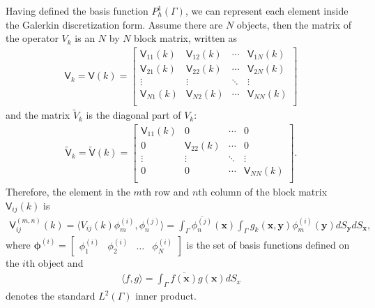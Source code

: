 Having defined the basis function $P_{h}^{1}(\Gamma)$, we can represent each element inside the Galerkin discretization form. Assume there are $N$ objects,
then the matrix of the operator $V_{k}$ is an $N$ by $N$ block matrix, written as 
\begin{align}\label{matrix V}
    \mathsf{V}_{k} = \mathsf{V}(k) = \begin{bmatrix}
        \mathsf{V}_{11}(k) & \mathsf{V}_{12}(k) & \cdots & \mathsf{V}_{1N}(k) \\
        \mathsf{V}_{21}(k) & \mathsf{V}_{22}(k) & \cdots & \mathsf{V}_{2N}(k) \\
        \vdots & \vdots & \ddots & \vdots \\
        \mathsf{V}_{N1}(k) & \mathsf{V}_{N2}(k) & \cdots & \mathsf{V}_{NN}(k) \\
\end{bmatrix}
\end{align}
and the matrix $\tilde{V}_{k}$ is the diagonal part of $V_{k}$:
\begin{align}\label{matrix tilde V}
    \tilde{\mathsf{V}}_{k} =  \tilde{\mathsf{V}}(k) = \begin{bmatrix}
        \mathsf{V}_{11}(k) & 0      & \cdots & 0 \\
    0      & \mathsf{V}_{22}(k) & \cdots & 0\\
    \vdots & \vdots & \ddots & \vdots \\
    0      & 0      & \cdots & \mathsf{V}_{NN}(k) \\
\end{bmatrix}.
\end{align}
Therefore, the element in the $m$th row and $n$th column of the block matrix $\mathsf{V}_{ij}(k)$ is 
\begin{align}\label{Elements in matrix V}
    \mathsf{V}_{ij}^{(m,n)} (k) = \langle V_{ij}(k)\phi_{m}^{(i)}, \phi_{n}^{(j)}\rangle = 
    \int_{\Gamma}\overline{\phi_{n}^{(j)}}(\boldsymbol{x})\int_{\Gamma}g_{k}(\boldsymbol{x}, \boldsymbol{y})\phi_{m}^{(i)}(\boldsymbol{y})dS_{\boldsymbol{y}}dS_{\boldsymbol{x}},
\end{align}
where $\boldsymbol{\phi}^{(i)} = \begin{bmatrix}
    \phi_{1}^{(i)} & \phi_{2}^{(i)} & \dots & \phi_{N}^{(i)}
\end{bmatrix}$ is the set of basis functions defined on the $i$th object and 
\begin{align*}
    \langle f, g \rangle = \int_{\Gamma}\overline{f(\boldsymbol{x})}g(\boldsymbol{x})dS_{x}
\end{align*}
denotes the standard $L^{2}(\Gamma)$ inner product.


